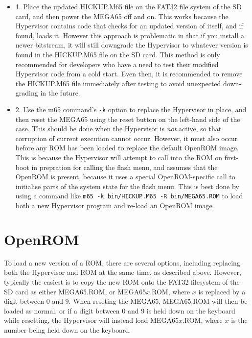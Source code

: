 \begin{itemize}
	\item 1. Place the updated HICKUP.M65 file on the FAT32 file system of the SD card, and then power the MEGA65 off and on.  This works because the Hypervisor contains code that checks for an updated version of itself, and if found, loads it. However this approach is problematic in that if you install a newer bitstream, it will still downgrade the Hypervisor to whatever version is found in the HICKUP.M65 file on the SD card.  This method is only recommended for developers who have a need to test their modified Hypervisor code from a cold start. Even then, it is recommended to remove the HICKUP.M65 file immediately after testing to avoid unexpected down-grading in the future.
	\item 2. Use the m65 command's {\tt -k} option to replace the Hypervisor in place, and then reset the MEGA65 using the reset button on the left-hand side of the case.  This should be done when the Hypervisor is {\em not} active, so that corruption of current execution cannot occur. However, it must also occur before any ROM has been loaded to replace the default OpenROM image.  This is because the Hypervisor will attempt to call into the ROM on first-boot in prepration for calling the flash menu, and assumes that the OpenROM is present, because it uses a special OpenROM-specific call to initialise parts of the system state for the flash menu.  This is best done by using a command like {\tt m65 -k bin/HICKUP.M65 -R bin/MEGA65.ROM} to load both a new Hypervisor program and re-load an OpenROM image.
\end{itemize}

\section{OpenROM}

To load a new version of a ROM, there are several options, including replacing both the Hypervisor and ROM at the same time, as described above. However, typically the easiest is to copy the new ROM onto the FAT32 filesystem of the SD card as either MEGA65.ROM, or MEGA65$x$.ROM, where $x$ is replaced by a digit between 0 and 9.  When reseting the MEGA65, MEGA65.ROM will then be loaded as normal, or if a digit between 0 and 9 is held down on the keyboard while resetting, the Hypervisor will instead load MEGA65$x$.ROM, where $x$ is the number being held down on the keyboard.
